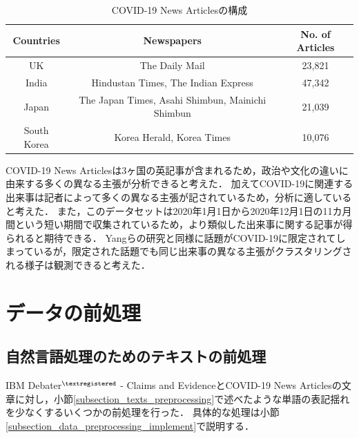 \documentclass[12pt,a4j]{jreport}
\begin{document}
\begin{table}[H]
  \caption{COVID-19 News Articlesの構成}
  \centering
  \vspace{4mm}
  \begin{tabular}{ccc}
    \hline
    Countries & Newspapers & No. of Articles \\
    \hline
    UK & The Daily Mail & 23,821 \\
    India & Hindustan Times, The Indian Express & 47,342 \\
    Japan & The Japan Times, Asahi Shimbun, Mainichi Shimbun & 21,039 \\
    South Korea & Korea Herald, Korea Times & 10,076 \\
    \hline
    \end{tabular}
  \label{covid_19_news_articles_composition}
\end{table}

\newpage

COVID-19 News Articlesは3ヶ国の英記事が含まれるため，政治や文化の違いに由来する多くの異なる主張が分析できると考えた．
加えてCOVID-19に関連する出来事は記者によって多くの異なる主張が記されているため，分析に適していると考えた．
また，このデータセットは2020年1月1日から2020年12月1日の11カ月間という短い期間で収集されているため，より類似した出来事に関する記事が得られると期待できる．
Yangらの研究と同様に話題がCOVID-19に限定されてしまっているが，限定された話題でも同じ出来事の異なる主張がクラスタリングされる様子は観測できると考えた．

\section{データの前処理}
\label{section_preprocessing_data}

\subsection{自然言語処理のためのテキストの前処理}
IBM Debater$^{\textregistered}$ - Claims and EvidenceとCOVID-19 News Articlesの文章に対し，小節\ref{subsection_texts_preprocessing}で述べたような単語の表記揺れを少なくするいくつかの前処理を行った．
具体的な処理は小節\ref{subsection_data_preprocessing_implement}で説明する．

\end{document}

